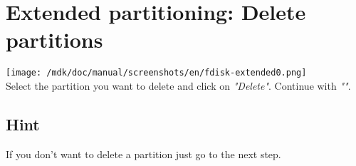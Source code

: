 \section{Extended partitioning: Delete partitions}
\texttt{[image: /mdk/doc/manual/screenshots/en/fdisk-extended0.png]} \\
Select the partition you want to delete and click on \textit{"Delete"}. Continue with \textit{""}.\\
\subsection{Hint}
If you don't want to delete a partition just go to the next step.\\
